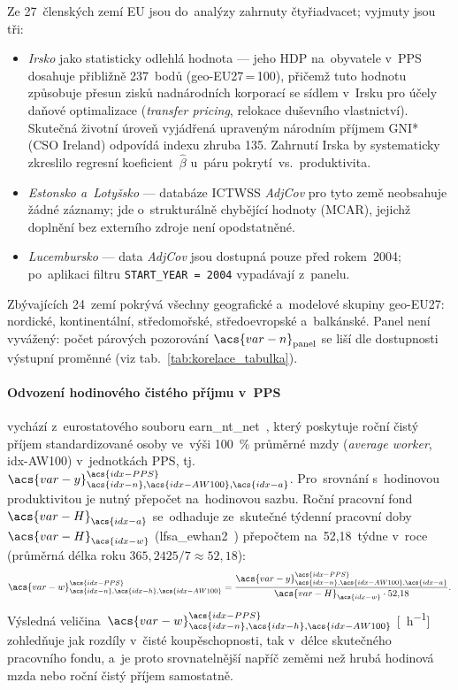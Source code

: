 Ze 27~členských zemí \acs{EU} jsou do~analýzy zahrnuty čtyřiadvacet; vyjmuty
jsou tři:
\begin{itemize}
  \item \emph{Irsko} jako statisticky odlehlá hodnota --- jeho \ac{HDP} na~obyvatele
    v~\acs{PPS} dosahuje přibližně 237~bodů (\acs{geo-EU27}\,=\,100), přičemž tuto
    hodnotu způsobuje přesun zisků nadnárodních korporací se sídlem
    v~Irsku pro účely daňové optimalizace (\textit{transfer pricing},
    relokace duševního vlastnictví). Skutečná životní úroveň vyjádřená
    upraveným národním příjmem GNI* (CSO Ireland) odpovídá indexu zhruba 135.
    Zahrnutí Irska by systematicky zkreslilo regresní koeficient~$\hat{\beta}$
    u~páru pokrytí~vs.~produktivita.
  \item \emph{Estonsko a~Lotyšsko} --- databáze \acs{ICTWSS} \textit{AdjCov}
    pro tyto země neobsahuje žádné záznamy; jde o~strukturálně chybějící
    hodnoty (MCAR), jejichž doplnění bez externího zdroje není opodstatněné.
  \item \emph{Lucembursko} --- data \textit{AdjCov} jsou dostupná pouze před
    rokem~2004; po~aplikaci filtru \texttt{START\_YEAR\,=\,2004} vypadávají
    z~panelu.
\end{itemize}
Zbývajících 24~zemí pokrývá všechny geografické a~modelové skupiny \acs{geo-EU27}: nordické, kontinentální, středomořské, středoevropské
a~balkánské. Panel není vyvážený: počet párových pozorování
$\acs{var-n}_{\text{panel}}$ se liší dle dostupnosti výstupní proměnné (viz tab.~\ref{tab:korelace_tabulka}).

\paragraph{Odvození hodinového čistého příjmu v~\acs{PPS}}\label{par:pps_hourly} vychází z~eurostatového souboru earn\_nt\_net~\cite{eurostat_earn_nt_net_PPS_AW100}, který
poskytuje roční čistý příjem standardizované osoby ve~výši \SI{100}{\percent}
průměrné mzdy (\textit{average worker}, \acs{idx-AW100}) v~jednotkách \acs{PPS},
tj.\ $\acs{var-y}^{\acs{idx-PPS}}_{\acs{idx-n},\acs{idx-AW100},\acs{idx-a}}$.
Pro~srovnání s~hodinovou produktivitou je nutný přepočet na~hodinovou sazbu.
Roční pracovní fond~$\acs{var-H}_{\acs{idx-a}}$ se~odhaduje ze~skutečné týdenní
pracovní doby~$\acs{var-H}_{\acs{idx-w}}$
(lfsa\_ewhan2~\cite{eurostat_lfsa_ewhan2_HR_weekly}) přepočtem na~52,18~týdne
v~roce (průměrná délka roku $365{,}2425/7 \approx 52{,}18$):
\begin{equation}\label{eq:pps_hourly}
  \acs{var-w}^{\acs{idx-PPS}}_{\acs{idx-n},\acs{idx-h},\acs{idx-AW100}}
    = \frac{\acs{var-y}^{\acs{idx-PPS}}_{\acs{idx-n},\acs{idx-AW100},\acs{idx-a}}}
           {\acs{var-H}_{\acs{idx-w}} \cdot 52{,}18}.
\end{equation}
Výsledná veličina~$\acs{var-w}^{\acs{idx-PPS}}_{\acs{idx-n},\acs{idx-h},\acs{idx-AW100}}$
[\si{\pps\per\hour}] zohledňuje jak rozdíly v~čisté koupěschopnosti, tak
v~délce skutečného pracovního fondu, a~je proto srovnatelnější napříč zeměmi
než hrubá hodinová mzda nebo roční čistý příjem samostatně.

